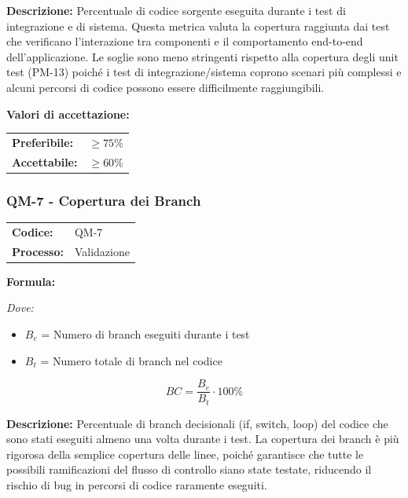 \documentclass[a4paper,11pt,oneside]{scrartcl}
\begin{document}
\noindent\textbf{Descrizione:} Percentuale di codice sorgente eseguita durante i test di integrazione e di sistema. Questa metrica valuta la copertura raggiunta dai test che verificano l'interazione tra componenti e il comportamento end-to-end dell'applicazione. Le soglie sono meno stringenti rispetto alla copertura degli unit test (PM-13) poiché i test di integrazione/sistema coprono scenari più complessi e alcuni percorsi di codice possono essere difficilmente raggiungibili.

\vspace{0.2cm}
\noindent\textbf{Valori di accettazione:}
\vspace{0.1cm}

\noindent
\begin{tabular}{@{}ll@{}}
    \textbf{Preferibile:} & $\ge 75\%$ \\
    \textbf{Accettabile:} & $\ge 60\%$ \\
\end{tabular}

\subsubsection{QM-7 - Copertura dei Branch}

\noindent
\begin{tabular}{@{}p{}p{}@{}}
    \textbf{Codice:}   & QM-7        \\
    \textbf{Processo:} & Validazione \\
\end{tabular}

\vspace{0.3cm}
\noindent\textbf{Formula:}

\noindent\textit{Dove:}
\begin{itemize}[leftmargin=1.5cm, topsep=0pt, itemsep=0pt]
    \item $B_e$ = Numero di branch eseguiti durante i test
    \item $B_t$ = Numero totale di branch nel codice
\end{itemize}

\[
    BC = \frac{B_e}{B_t} \cdot 100\%
\]

\noindent\textbf{Descrizione:} Percentuale di branch decisionali (if, switch, loop) del codice che sono stati eseguiti almeno una volta durante i test. La copertura dei branch è più rigorosa della semplice copertura delle linee, poiché garantisce che tutte le possibili ramificazioni del flusso di controllo siano state testate, riducendo il rischio di bug in percorsi di codice raramente eseguiti.
\end{document}
